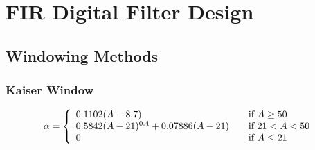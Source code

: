 \section{FIR Digital Filter Design}

\subsection{Windowing Methods}
\subsubsection{Kaiser Window}
\begin{align}
	\alpha = \left\{
		\begin{array}{l l}
			0.1102(A-8.7)& \quad \text{if } A \geq 50\\
			0.5842(A-21)^{0.4}+0.07886(A-21) & \quad \text{if }21 < A < 50\\
			0 & \quad \text{if } A \leq 21
		\end{array} \right.
\end{align}

